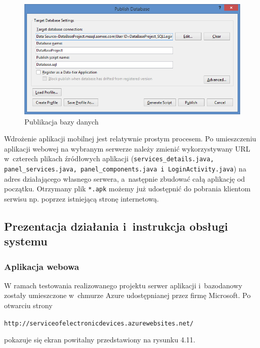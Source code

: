 \documentclass[a4paper,11pt]{article}
\begin{document}
\begin{figure}[h!]
	\centering
	\includegraphics[width=\textwidth,height=0.4\textheight]{db4.png}
	\caption{Publikacja bazy danych}
\end{figure}

Wdrożenie aplikacji mobilnej jest relatywnie prostym procesem. Po umieszczeniu aplikacji webowej na wybranym serwerze należy zmienić wykorzystywany URL w~czterech plikach źródłowych aplikacji (\texttt{services\_details.java, panel\_services.java, panel\_components.java i~LoginActivity.java}) na adres działającego własnego serwera, a~następnie zbudować całą aplikację od początku. Otrzymany plik \texttt{*.apk} możemy już udostępnić do pobrania klientom serwisu np. poprzez istniejącą stronę internetową.
\subsection{Prezentacja działania i~instrukcja obsługi systemu}
\subsubsection{Aplikacja webowa}
W ramach testowania realizowanego projektu serwer aplikacji i~bazodanowy zostały umieszczone w~chmurze Azure udostępnianej przez firmę Microsoft. Po otwarciu strony
\begin{center}
	\vspace{-0.2cm}
	\texttt{http://serviceofelectronicdevices.azurewebsites.net/}
\end{center} 
\vspace{-0.2cm} pokazuje się ekran powitalny przedstawiony na rysunku 4.11.
\end{document}
